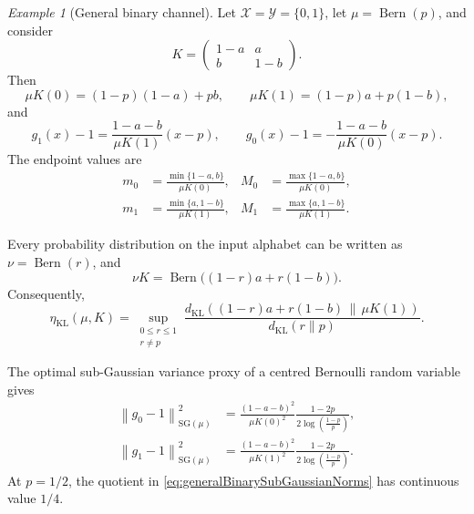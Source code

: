 \documentclass[11pt]{article}
\theoremstyle{plain}
\theoremstyle{remark}
\newtheorem{example}{Example}
\begin{document}
\begin{example}[General binary channel]\label{ex:generalBinaryChannel}
Let $\mathcal X=\mathcal Y=\{0,1\}$, let
$\mu=\operatorname{Bern}(p)$, and consider
\begin{equation}
K=
\begin{pmatrix}
1-a & a\\
b & 1-b
\end{pmatrix}.
\end{equation}
Then
\begin{equation}
\mu K(0)=(1-p)(1-a)+pb,
\qquad
\mu K(1)=(1-p)a+p(1-b),
\end{equation}
and
\begin{equation}
g_1(x)-1
=
\frac{1-a-b}{\mu K(1)}(x-p),
\qquad
g_0(x)-1
=
-\frac{1-a-b}{\mu K(0)}(x-p).
\label{eq:generalBinaryReverseDensities}
\end{equation}
The endpoint values are
\begin{align}
m_0&=\frac{\min\{1-a,b\}}{\mu K(0)},
&
M_0&=\frac{\max\{1-a,b\}}{\mu K(0)},
\nonumber\\
m_1&=\frac{\min\{a,1-b\}}{\mu K(1)},
&
M_1&=\frac{\max\{a,1-b\}}{\mu K(1)}.
\label{eq:generalBinaryEndpoints}
\end{align}

Every probability distribution on the input alphabet can be written as
$\nu=\operatorname{Bern}(r)$, and
\[
\nu K
=
\operatorname{Bern}\bigl((1-r)a+r(1-b)\bigr).
\]
Consequently,
\begin{equation}
\eta_{\mathrm{KL}}(\mu,K)
=
\sup_{\substack{0\leq r\leq1\\r\neq p}}
\frac{
d_{\mathrm{KL}}\!\left(
(1-r)a+r(1-b)
\,\middle\|\,
\mu K(1)
\right)
}{
d_{\mathrm{KL}}(r\|p)
}.
\label{eq:generalBinaryExactKL}
\end{equation}

The optimal sub-Gaussian variance proxy of a centred Bernoulli random
variable gives
\begin{align}
\left\lVert g_0-1\right\rVert_{\mathrm{SG}(\mu)}^2
&=
\frac{(1-a-b)^2}{\mu K(0)^2}
\frac{1-2p}{
2\log\!\left(\frac{1-p}{p}\right)},
\nonumber\\
\left\lVert g_1-1\right\rVert_{\mathrm{SG}(\mu)}^2
&=
\frac{(1-a-b)^2}{\mu K(1)^2}
\frac{1-2p}{
2\log\!\left(\frac{1-p}{p}\right)}.
\label{eq:generalBinarySubGaussianNorms}
\end{align}
At $p=1/2$, the quotient in
\eqref{eq:generalBinarySubGaussianNorms} has continuous value $1/4$.


\end{example}
\end{document}
